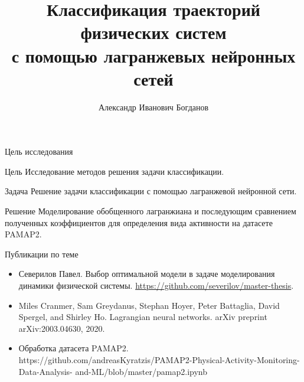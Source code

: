 \documentclass{beamer}
\title[\hbox to 56mm{Классификация траекторий физических систем}]{Классификация траекторий физических систем\\ с помощью лагранжевых нейронных сетей}
\author[А.\,И.~Богданов]{Александр Иванович Богданов}
\institute{Московский физико-технический институт}
\date{\footnotesize
\par\smallskip\emph{Курс:} Моя первая научная статья
\par\smallskip\emph{Эксперт:} В.\,В.~Стрижов
\par\smallskip\emph{Консультант:} С.\,К.~Панченко
\par\bigskip\small 2023}
\begin{document}

\begin{frame}

    \thispagestyle{empty}
    \maketitle
    
\end{frame}


\begin{frame}{Цель исследования}
    \begin{block}{Цель}
        Исследование методов решения задачи классификации.
    \end{block}
    \begin{block}{Задача}
        Решение задачи классификации с помощью лагранжевой нейронной сети.
    \end{block}
    \begin{block}{Решение}
        Моделирование обобщенного лагранжиана и последующим сравнением полученных коэффициентов для определения вида активности на датасете PAMAP2.
    \end{block}
\end{frame}


\begin{frame}{Публикации по теме}
    \begin{itemize}
    
    \item Северилов Павел. Выбор оптимальной модели в задаче моделирования динамики физической системы. \url{https://github.com/severilov/master-thesis}.

    \item Miles Cranmer, Sam Greydanus, Stephan Hoyer, Peter Battaglia, David Spergel, and Shirley Ho. Lagrangian neural networks. arXiv preprint arXiv:2003.04630, 2020.

    \item Обработка датасета PAMAP2. https://github.com/andreasKyratzis/PAMAP2-Physical-Activity-Monitoring-Data-Analysis- and-ML/blob/master/pamap2.ipynb
  
    \end{itemize}
\end{frame}
\end{document}
